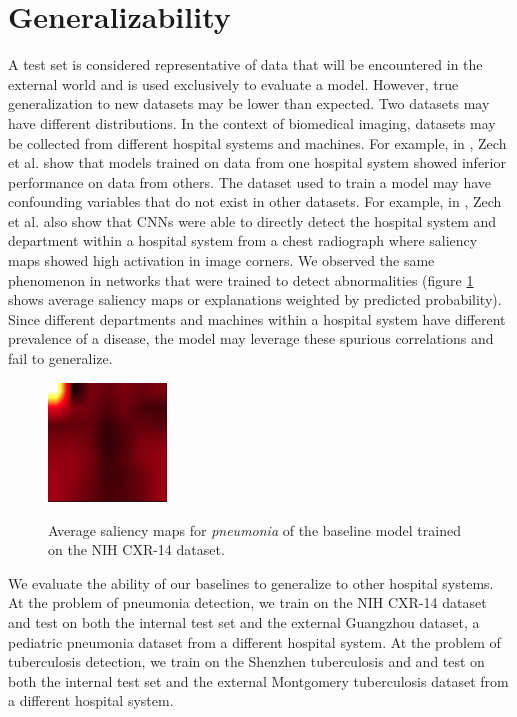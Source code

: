 \documentclass[oneside,a4paper]{article}
\begin{document}
\section{Generalizability}
A test set is considered representative of data that will be encountered in the
external world and is used exclusively to evaluate a model. However, true
generalization to new datasets may be lower than expected. Two datasets may have different distributions. In the context of
biomedical imaging, datasets may be collected from different hospital
systems and machines. For example, in \cite{zech2018variable}, Zech et al.
show that models trained on data from one hospital system showed inferior
performance on data from others. The dataset used to train a model may have confounding variables that do
not exist in other datasets. For example, in \cite{zech2018variable}, Zech
et al. also show that CNNs were able to directly detect the hospital system
and department within a hospital system from a chest radiograph where
saliency maps showed high activation in image corners. We observed the same
phenomenon in networks that were trained to detect abnormalities (figure \ref{avg_saliency_maps} shows average saliency maps or explanations weighted by predicted probability). Since
different departments and machines within a hospital system have different
prevalence of a disease, the model may leverage these spurious correlations
and fail to generalize. \\

\begin{figure}[]
  \centering
  \includegraphics[width=0.28\textwidth]{images/heatmap_224_da}\\[0.01\textwidth]
  \caption{Average saliency maps for \emph{pneumonia} of the baseline model trained on the NIH CXR-14 dataset.}
  \label{avg_saliency_maps}
\end{figure}

We evaluate the ability of our baselines to generalize to other hospital
systems. At the problem of pneumonia detection, we train on the NIH CXR-14
dataset and test on both the internal test set and the external Guangzhou
dataset, a pediatric pneumonia dataset from a different hospital system.
At the problem of tuberculosis detection, we train on the Shenzhen tuberculosis
and and test on both the internal test set and the external Montgomery
tuberculosis
dataset from a different hospital system.\\
\end{document}
